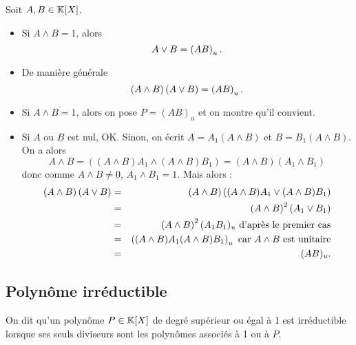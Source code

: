 \documentclass{magnolia}
\begin{document}

\begin{proposition}
Soit $A,B\in\polyK$.
\begin{itemize}
\item Si $A\wedge B=1$, alors
  \[A\vee B=\left(AB\right)_u.\]
\item De manière générale
  \[\left(A\wedge B\right)\left(A\vee B\right)=\left(AB\right)_u.\]
\end{itemize}
\end{proposition}

\begin{preuve}
\begin{itemize}
\item Si $A\wedge B=1$, alors on pose $P=(AB)_u$ et on montre qu'il convient.
\item Si $A$ ou $B$ est nul, OK. Sinon, on écrit $A=A_1(A\wedge B)$ et $B=B_1(A\wedge B)$. On a alors $$A\wedge B=((A\wedge B)A_1\wedge (A\wedge B)B_1)=(A\wedge B)(A_1\wedge B_1)$$
donc comme $A\wedge B\neq 0$, $A_1\wedge B_1=1$.
Mais alors :
\begin{eqnarray*}
\left(A\wedge B\right)\left(A\vee B\right)&=&\left(A\wedge B\right)\left((A\wedge B)A_1\vee (A\wedge B)B_1\right)\\
&=&\left(A\wedge B\right)^2(A_1\vee B_1)\\
&=&\left(A\wedge B\right)^2 (A_1B_1)_u \text{ d'après le premier cas}\\
&=&\left((A\wedge B)A_1 (A\wedge B)B_1\right)_u \text{ car $A\wedge B$ est unitaire}\\
&=& (AB)_u.
\end{eqnarray*}
\end{itemize}

\end{preuve}

\subsection{Polynôme irréductible}

\begin{definition}
On dit qu'un polynôme $P\in\polyK$ de degré supérieur ou égal à 1 est
irréductible lorsque ses seuls diviseurs sont les polynômes associés à 1
ou à $P$.
\end{definition}
\end{document}
